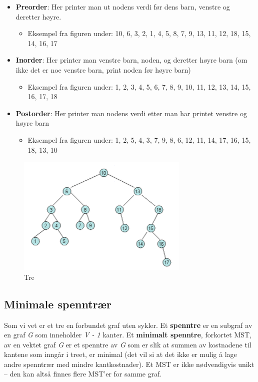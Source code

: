 \begin{boxed}
\begin{itemize}
    \item \textbf{Preorder}: Her printer man ut nodens verdi før dens barn, venstre og deretter høyre. 
    \begin{itemize}
        \item Eksempel fra figuren under: 10, 6, 3, 2, 1, 4, 5, 8, 7, 9, 13, 11, 12, 18, 15, 14, 16, 17
    \end{itemize}
    \item \textbf{Inorder}: Her printer man venstre barn, noden, og deretter høyre barn (om ikke det er noe venstre barn, print noden før høyre barn)
    \begin{itemize}
        \item Eksempel fra figuren under: 1, 2, 3, 4, 5, 6, 7, 8, 9, 10, 11, 12, 13, 14, 15, 16, 17, 18
    \end{itemize}
    \item \textbf{Postorder}: Her printer man nodens verdi etter man har printet venstre og høyre barn
    \begin{itemize}
        \item Eksempel fra figuren under: 1, 2, 5, 4, 3, 7, 9, 8, 6, 12, 11, 14, 17, 16, 15, 18, 13, 10
    \end{itemize}
\end{itemize}

\begin{figure}[H]
\includegraphics[scale=0.8]{images/tregraf}
\centering %
\caption{Tre}
\label{fig:tregraf}
\end{figure}
\end{boxed}

\subsection{Minimale spenntrær}
Som vi vet er et tre en forbundet graf uten sykler. Et \textbf{spenntre} er en subgraf av en graf \textit{G} som inneholder \textit{V - 1} kanter. Et \textbf{minimalt spenntre}, forkortet MST, av en vektet graf \textit{G} er et spenntre av \textit{G} som er slik at summen av kostnadene til kantene som inngår i treet, er minimal (det vil si at det ikke er mulig å lage andre spenntrær med mindre kantkostnader). Et MST er ikke nødvendigvis unikt – den kan altså finnes flere MST'er for samme graf.

